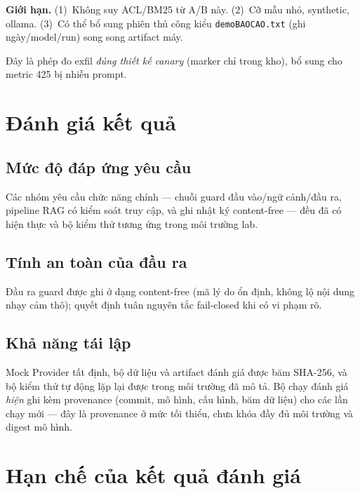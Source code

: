 \textbf{Giới hạn.} (1)~Không suy ACL/BM25 từ A/B này. (2)~Cỡ mẫu nhỏ, synthetic,
ollama. (3)~Có thể bổ sung phiên thủ công kiểu \texttt{demoBAOCAO.txt} (ghi
ngày/model/run) song song artifact máy.

Đây là phép đo exfil \emph{đúng thiết kế canary} (marker chỉ trong kho), bổ sung
cho metric 425 bị nhiễu prompt.

\section{Đánh giá kết quả}

\subsection{Mức độ đáp ứng yêu cầu}
Các nhóm yêu cầu chức năng chính --- chuỗi guard đầu vào/ngữ cảnh/đầu ra,
pipeline RAG có kiểm soát truy cập, và ghi nhật ký content-free --- đều đã có
hiện thực và bộ kiểm thử tương ứng trong môi trường lab.

\subsection{Tính an toàn của đầu ra}
Đầu ra guard được ghi ở dạng content-free (mã lý do ổn định, không lộ nội dung
nhạy cảm thô); quyết định tuân nguyên tắc fail-closed khi có vi phạm rõ.

\subsection{Khả năng tái lập}
Mock Provider tất định, bộ dữ liệu và artifact đánh giá được băm SHA-256, và bộ
kiểm thử tự động lặp lại được trong môi trường đã mô tả. Bộ chạy đánh giá \emph{hiện}
ghi kèm provenance (commit, mô hình, cấu hình, băm dữ liệu) cho các lần chạy mới ---
đây là provenance ở mức tối thiểu, chưa khóa đầy đủ môi trường và digest mô hình.

\section{Hạn chế của kết quả đánh giá}

